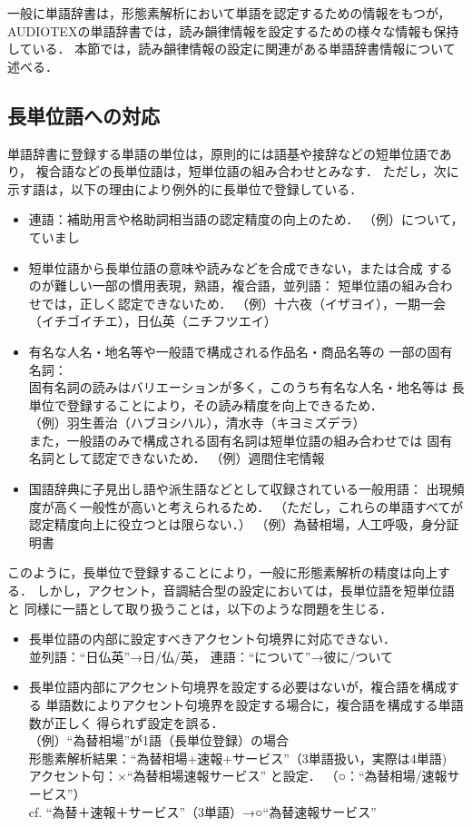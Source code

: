 一般に単語辞書は，形態素解析において単語を認定するための情報をもつが，
AUDIOTEXの単語辞書では，読み韻律情報を設定するための様々な情報も保持している．
本節では，読み韻律情報の設定に関連がある単語辞書情報について述べる．

\vspace{3mm}
\subsection{長単位語への対応}\label{subs:cho}
単語辞書に登録する単語の単位は，原則的には語基や接辞などの短単位語であり，
複合語などの長単位語は，短単位語の組み合わせとみなす．
ただし，次に示す語は，以下の理由により例外的に長単位で登録している．
\begin{itemize}
\item 連語：補助用言や格助詞相当語の認定精度の向上のため．
（例）について，ていまし
\item 短単位語から長単位語の意味や読みなどを合成できない，または合成
するのが難しい一部の慣用表現，熟語，複合語，並列語：
短単位語の組み合わせでは，正しく認定できないため．
 （例）十六夜（イザヨイ），一期一会（イチゴイチエ），日仏英（ニチフツエイ）
\item 有名な人名・地名等や一般語で構成される作品名・商品名等の
一部の固有名詞：\\
固有名詞の読みはバリエーションが多く，このうち有名な人名・地名等は
長単位で登録することにより，その読み精度を向上できるため．\\
（例）羽生善治（ハブヨシハル），清水寺（キヨミズデラ）\\
また，一般語のみで構成される固有名詞は短単位語の組み合わせでは
固有名詞として認定できないため．
（例）週間住宅情報
\item 国語辞典に子見出し語や派生語などとして収録されている一般用語：
出現頻度が高く一般性が高いと考えられるため．
（ただし，これらの単語すべてが認定精度向上に役立つとは限らない．）
（例）為替相場，人工呼吸，身分証明書
\end{itemize}

このように，長単位で登録することにより，一般に形態素解析の精度は向上する．
しかし，アクセント，音調結合型の設定においては，長単位語を短単位語と
同様に一語として取り扱うことは，以下のような問題を生じる．



\begin{itemize}
\item 長単位語の内部に設定すべきアクセント句境界に対応できない．\\
並列語：``日仏英''→日/仏/英，
連語：``について''→彼{\dg に}/{\dg ついて}
\item 長単位語内部にアクセント句境界を設定する必要はないが，複合語を構成する
単語数によりアクセント句境界を設定する場合に，複合語を構成する単語数が正しく
得られず設定を誤る．\\
（例）``為替相場''が1語（長単位登録）の場合\\
形態素解析結果：``為替相場+速報+サービス''（3単語扱い，実際は4単語)\\
アクセント句：×``為替相場速報サービス'' と設定．
（○：``為替相場/速報サービス''）\\
cf. ``為替＋速報＋サービス''（3単語）→○``為替速報サービス''
\end{itemize}


